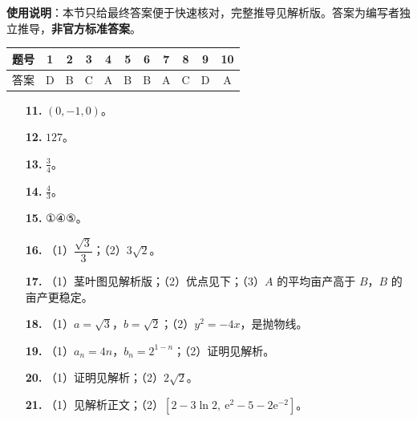 
\begin{gknotice}
\textbf{使用说明}：本节只给最终答案便于快速核对，完整推导见解析版。答案为编写者独立推导，\textbf{非官方标准答案}。
\end{gknotice}

\begin{center}\begin{tabular}{ccccccccccc}
\toprule
题号 & 1 & 2 & 3 & 4 & 5 & 6 & 7 & 8 & 9 & 10 \\
\midrule
答案 & D & B & C & A & B & B & A & C & D & A \\
\bottomrule
\end{tabular}\end{center}

\begin{itemize}[leftmargin=2.6em]
  \item[\textbf{11.}] $(0,-1,0)$。
  \item[\textbf{12.}] $127$。
  \item[\textbf{13.}] $\frac34$。
  \item[\textbf{14.}] $\frac43$。
  \item[\textbf{15.}] ①④⑤。
\end{itemize}

\begin{itemize}[leftmargin=2.6em]
  \item[\textbf{16.}] （1）$\dfrac{\sqrt3}{3}$；（2）$3\sqrt2$。
  \item[\textbf{17.}] （1）茎叶图见解析版；（2）优点见下；（3）$A$ 的平均亩产高于 $B$，$B$ 的亩产更稳定。
  \item[\textbf{18.}] （1）$a=\sqrt3$，$b=\sqrt2$；（2）$y^2=-4x$，是抛物线。
  \item[\textbf{19.}] （1）$a_n=4n$，$b_n=2^{1-n}$；（2）证明见解析。
  \item[\textbf{20.}] （1）证明见解析；（2）$2\sqrt2$。
  \item[\textbf{21.}] （1）见解析正文；（2）$\left[2-3\ln2,\ \mathrm e^2-5-2\mathrm e^{-2}\right]$。
\end{itemize}
